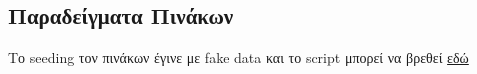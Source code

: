 \documentclass[../main.tex]{subfiles}
\begin{document}
\subsection{Παραδείγματα Πινάκων}

Το seeding τον πινάκων έγινε με fake data και το script μπορεί να βρεθεί
\href{https://github.com/johnstef99/GoT-db-auth/blob/master/laravel/got-db/database/seeders/DatabaseSeeder.php}{εδώ}


\end{document}
